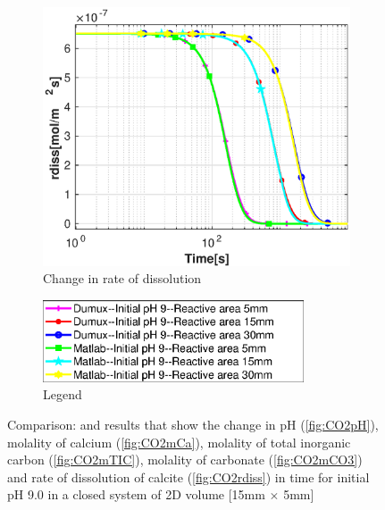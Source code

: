 \begin{figure}
    \hfill
    \begin{subfigure}{.5\linewidth}
            \centering
        \includegraphics[width=\textwidth]{PICTURES/dvm_pH9_rdiss.eps}
        \caption{Change in rate of dissolution}
        \label{fig:dvmpH9rdiss}
    \end{subfigure}%
    \begin{subfigure}{.5\linewidth}
            \centering
        \includegraphics[width=0.85\textwidth]{PICTURES/dvm_pH9_legend.eps}
        \caption{Legend}
        \label{fig:dvmpH9legend}
    \end{subfigure}%
    \caption{Comparison: \DuMuX and \MATLAB results that show the change in pH 
    (\cref{fig:CO2pH}), molality of calcium (\cref{fig:CO2mCa}), molality of total 
    inorganic carbon (\cref{fig:CO2mTIC}), molality of carbonate (\cref{fig:CO2mCO3}) 
    and rate of dissolution of calcite (\cref{fig:CO2rdiss}) in time for initial pH 9.0 in 
    a closed system of 2D volume [15mm $\times$ 5mm]} 
    \label{fig:comparisionDumuxMatlab_pH9.0}
\end{figure}
    
    
\endinput